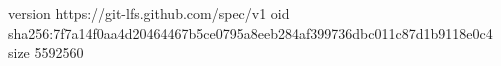version https://git-lfs.github.com/spec/v1
oid sha256:7f7a14f0aa4d20464467b5ce0795a8eeb284af399736dbc011c87d1b9118e0c4
size 5592560
